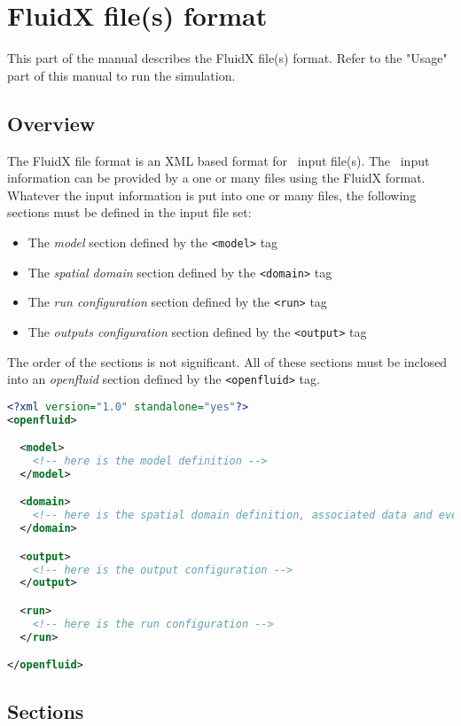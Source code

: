 \chapter{FluidX file(s) format}

This part of the manual describes the FluidX file(s) format. Refer to the "Usage"
part of this manual to run the simulation.

\section{Overview}

The FluidX file format is an XML based format for \OFname \ input file(s).
The \OFname \ input information can be provided by a one or many files using
the FluidX format.\\
Whatever the input information is put into one or many files, the following
sections must be defined in the input file set:
\begin{itemize}
  \item The \textit{model} section defined by the \texttt{<model>} tag
  \item The \textit{spatial domain} section defined by the \texttt{<domain>} tag
  \item The \textit{run configuration} section defined by the \texttt{<run>} tag
  \item The \textit{outputs configuration} section defined by the \texttt{<output>} tag  
\end{itemize}
The order of the sections is not significant. All of these sections must be
inclosed into an \textit{openfluid} section defined by the \texttt{<openfluid>}
tag.

\begin{lstlisting}[language=xml,title=\footnotesize\textit{summary view of the
XML tree for FluidX files}] <?xml version="1.0" standalone="yes"?>
<openfluid>

  <model>
    <!-- here is the model definition -->
  </model>

  <domain>
    <!-- here is the spatial domain definition, associated data and events -->   
  </domain>

  <output>
    <!-- here is the output configuration -->
  </output>

  <run>
    <!-- here is the run configuration -->
  </run>

</openfluid>
\end{lstlisting}


\section{Sections}


